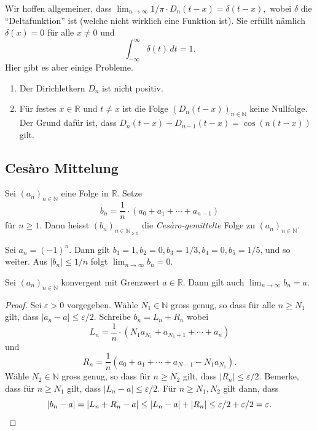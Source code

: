 \documentclass[../main.tex]{subfiles}
\begin{document}
Wir hoffen allgemeiner, dass
\(
  \lim_{n \to \infty} 1/\pi \cdot D_n(t-x) = \delta(t-x),
\)
wobei $\delta$ die ``Deltafunktion'' ist (welche nicht wirklich
eine Funktion ist). Sie erfüllt nämlich $\delta(x) = 0$
für alle $x \neq 0$ und
\[
  \int_{-\infty}^{\infty} \delta(t) \, dt = 1.
\]
Hier gibt es aber einige Probleme.
\begin{enumerate}[(1)]
  \item Der Dirichletkern $D_n$ ist nicht positiv.
  \item Für festes $x \in \mathbb{R}$ und $t \neq x$ 
    ist die Folge ${(D_n(t-x))}_{n \in \mathbb{N}}$
     keine Nullfolge.
     Der Grund dafür ist, dass
     \(
       D_n(t- x) - D_{n-1}(t-x)
       = \cos(n (t-x))
     \) gilt.
\end{enumerate}

\subsection*{Cesàro Mittelung}

\begin{definition}
  Sei ${(a_{n})}_{n \in \mathbb{N}}$ eine Folge in $\mathbb{R}$. Setze
  \[
    b_n = \frac{1}{n} \cdot (a_0 + a_1 + \cdots + a_{n-1})
  \]
  für $n \geq 1$.
  Dann heisst ${(b_{n})}_{n \in \mathbb{N_{\geq 1}}}$ die \emph{Cesàro-gemittelte}
  Folge zu ${(a_{n})}_{n \in \mathbb{N}}$.
\end{definition}

\begin{example}
  Sei $a_n = {(-1)}^n$. Dann gilt
  $b_1 = 1, b_2 = 0, b_3 = 1/3, b_4 = 0, b_5 = 1/5$, und so weiter.
  Aus $|b_n| \leq 1/n$ folgt $\lim_{n \to \infty} b_n = 0$.
\end{example}

\begin{lemma}\label{lem:cesaro-converges}
  Sei ${(a_{n})}_{n \in \mathbb{N}}$ konvergent mit Grenzwert $a \in \mathbb{R}$.
  Dann gilt auch $\lim_{n \to \infty} b_n = a$.
\end{lemma}

\begin{proof}
  Sei $\varepsilon > 0$ vorgegeben.
  Wähle $N_1 \in \mathbb{N}$ gross genug, so dass für alle $n \geq N_1$ gilt, dass
  $|a_n - a| \leq \varepsilon/2$.
  Schreibe $b_n = L_n + R_n$ wobei
  \[
    L_n = \frac{1}{n} \cdot (N_1 a_{N_1}  + a_{N_1 + 1} + \cdots + a_n)
  \]
  und
  \[
    R_n = \frac{1}{n} (a_0 + a_1 + \cdots + a_{N-1} - N_1 a_{N_1}).
  \]
  Wähle $N_2 \in \mathbb{N}$ gross genug, so dass für $n \geq N_2$ gilt,
  dass $|R_n| \leq \varepsilon/2$.
  Bemerke, dass für $n \geq N_1$ gilt, dass
  \(
    |L_n - a| \leq \varepsilon/2.
  \)
  Für $n \geq N_1, N_2$ gilt dann, dass
  \[
    |b_n - a| 
    = |L_n + R_n - a| \leq |L_n - a| + |R_n| \leq \varepsilon / 2 + \varepsilon/2 
    = \varepsilon. \qedhere
  \]
\end{proof}
\end{document}
